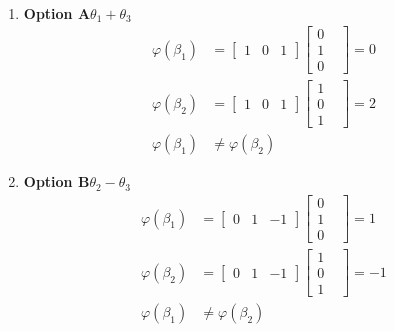 \documentclass{article}
\begin{document}
\\
\begin{enumerate}
\item \textbf{Option A}\quad $\theta_1 + \theta_3$\\
\begin{align*}
    \varphi(\beta_1) &= \begin{bmatrix} 1& 0& 1 \end{bmatrix} \begin{bmatrix} 0&\\ 1&\\ 0& \end{bmatrix} = 0\\
    \varphi(\beta_2) &= \begin{bmatrix} 1& 0& 1 \end{bmatrix} \begin{bmatrix} 1&\\ 0&\\ 1& \end{bmatrix} = 2\\
    \varphi(\beta_1) &\neq \varphi(\beta_2)
\end{align*}

\item \textbf{Option B}\quad $\theta_2 - \theta_3$\\
\begin{align*}
    \varphi(\beta_1) &= \begin{bmatrix} 0& 1& -1 \end{bmatrix} \begin{bmatrix} 0&\\ 1&\\ 0& \end{bmatrix} = 1\\
    \varphi(\beta_2) &= \begin{bmatrix} 0& 1& -1 \end{bmatrix} \begin{bmatrix} 1&\\ 0&\\ 1& \end{bmatrix} = -1\\
    \varphi(\beta_1) &\neq \varphi(\beta_2)
\end{align*}


\end{enumerate}
\end{document}
